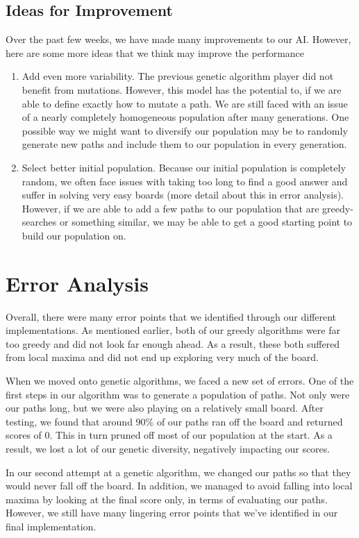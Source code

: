 \documentclass[journal,final,letterpaper,11pt]{IEEEtran}
\begin{document}
\subsection{Ideas for Improvement}
Over the past few weeks, we have made many improvements to our AI. However, here are some more ideas that we think may improve the performance
\begin{enumerate}
\item Add even more variability. The previous genetic algorithm player did not benefit from mutations. However, this model has the potential to, if we are able to define exactly how to mutate a path. We are still faced with an issue of a nearly completely homogeneous population after many generations. One possible way we might want to diversify our population may be to randomly generate new paths and include them to our population in every generation.
\item Select better initial population. Because our initial population is completely random, we often face issues with taking too long to find a good answer and suffer in solving very easy boards (more detail about this in error analysis). However, if we are able to add a few paths to our population that are greedy-searches or something similar, we may be able to get a good starting point to build our population on.
\end{enumerate}

\section{Error Analysis}
Overall, there were many error points that we identified through our different implementations. As mentioned earlier, both of our greedy algorithms were far too greedy and did not look far enough ahead. As a result, these both suffered from local maxima and did not end up exploring very much of the board. 

When we moved onto genetic algorithms, we faced a new set of errors. One of the first steps in our algorithm was to generate a population of paths. Not only were our paths long, but we were also playing on a relatively small board. After testing, we found that around $90\%$ of our paths ran off the board and returned scores of 0. This in turn pruned off most of our population at the start. As a result, we lost a lot of our genetic diversity, negatively impacting our scores. 

In our second attempt at a genetic algorithm, we changed our paths so that they would never fall off the board. In addition, we managed to avoid falling into local maxima by looking at the final score only, in terms of evaluating our paths. However, we still have many lingering error points that we've identified in our final implementation.
\end{document}
